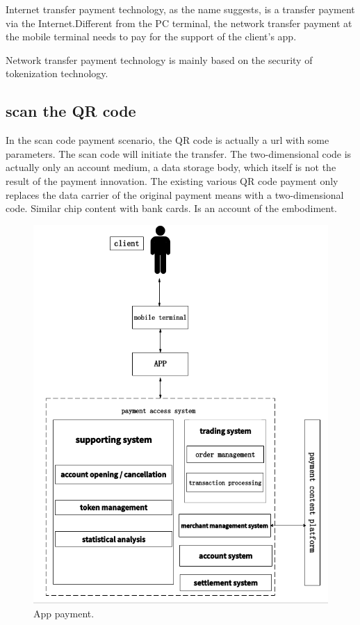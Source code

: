 \documentclass[journal]{IEEEtran}
\begin{document}
Internet transfer payment technology, as the name suggests, is a transfer payment via the Internet.Different from the PC terminal, the network transfer payment at the mobile terminal needs to pay for the support of the client's app.

Network transfer payment technology is mainly based on the security of tokenization technology.



\subsection{scan the QR code}
In the scan code payment scenario, the QR code is actually a url with some parameters. The scan code will initiate the transfer. The two-dimensional code is actually only an account medium, a data storage body, which itself is not the result of the payment innovation. The existing various QR code payment only replaces the data carrier of the original payment means with a two-dimensional code. Similar chip content with bank cards. Is an account of the embodiment. 
\begin{figure}[htbp]
\centerline{\includegraphics[scale=0.44]{erweimazhifu.png}}
\caption{App payment.}
\label{fig}
\end{figure}
\end{document}

